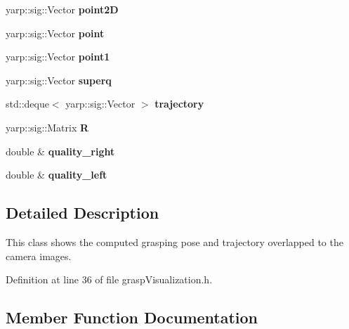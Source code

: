 \begin{DoxyCompactItemize}
\item 
yarp\+::sig\+::\+Vector {\bfseries point2D}\label{classGraspVisualization_ad377be64896271582eb9f5257ecef819}

\item 
yarp\+::sig\+::\+Vector {\bfseries point}\label{classGraspVisualization_ae8cf3097e9a8542ba3562fdfc8837995}

\item 
yarp\+::sig\+::\+Vector {\bfseries point1}\label{classGraspVisualization_a0a87a52dda56b81b1b6f7d36c969672c}

\item 
yarp\+::sig\+::\+Vector {\bfseries superq}\label{classGraspVisualization_a38fa19f89c4185545bc35be510ad6158}

\item 
std\+::deque$<$ yarp\+::sig\+::\+Vector $>$ {\bfseries trajectory}\label{classGraspVisualization_a7a9b020ba00e06ffc1d272214697a6b7}

\item 
yarp\+::sig\+::\+Matrix {\bfseries R}\label{classGraspVisualization_a0171ee2be1eb60dde9f889313b247658}

\item 
double \& {\bfseries quality\+\_\+right}\label{classGraspVisualization_aa82104f77a9903438727132275401f96}

\item 
double \& {\bfseries quality\+\_\+left}\label{classGraspVisualization_aabfdc93263c2684e1fecf110e733c090}

\end{DoxyCompactItemize}


\subsection{Detailed Description}
This class shows the computed grasping pose and trajectory overlapped to the camera images. 

Definition at line 36 of file grasp\+Visualization.\+h.



\subsection{Member Function Documentation}

